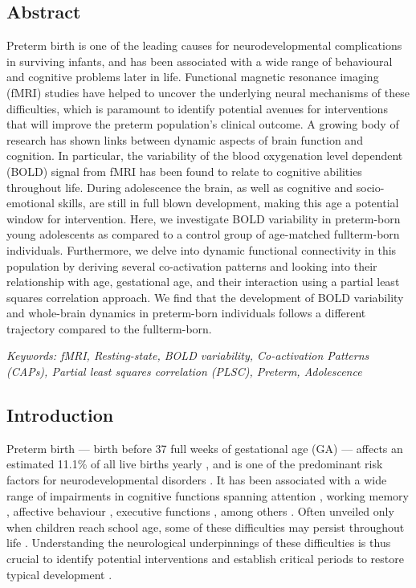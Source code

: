 \subsection*{Abstract}

Preterm birth is one of the leading causes for neurodevelopmental complications in surviving infants, and has been associated with a wide range of behavioural and cognitive problems later in life. Functional magnetic resonance imaging (fMRI) studies have helped to uncover the underlying neural mechanisms of these difficulties, which is paramount to identify potential avenues for interventions that will improve the preterm population's clinical outcome. A growing body of research has shown links between dynamic aspects of brain function and cognition. In particular, the variability of the blood oxygenation level dependent (BOLD) signal from fMRI has been found to relate to cognitive abilities throughout life. During adolescence the brain, as well as cognitive and socio-emotional skills, are still in full blown development, making this age a potential window for intervention. Here, we investigate BOLD variability in preterm-born young adolescents as compared to a control group of age-matched fullterm-born individuals. Furthermore, we delve into dynamic functional connectivity in this population by deriving several co-activation patterns and looking into their relationship with age, gestational age, and their interaction using a partial least squares correlation approach. We find that the development of BOLD variability and whole-brain dynamics in preterm-born individuals follows a different trajectory compared to the fullterm-born.


\textit{Keywords: fMRI, Resting-state, BOLD variability, Co-activation Patterns (CAPs), Partial least squares correlation (PLSC), Preterm, Adolescence}

\subsection{Introduction}
 Preterm birth --- birth before 37 full weeks of gestational age (GA) --- affects an estimated 11.1\% of all live births yearly \citep{Blencowe2013}, and is one of the predominant risk factors for neurodevelopmental disorders \citep{Twilhaar2018}. 
    It has been associated with a wide range of impairments in cognitive functions spanning attention \citep{Rommel2017}, working memory \citep{Allotey2018}, affective behaviour \citep{Hornman2016}, executive functions \citep{Costa2017, Burnett2018}, among others \citep{Moreira2014, Allotey2018}. Often unveiled only when children reach school age, some of these difficulties may persist throughout life \citep{Anderson2014, Kajantie2019}. Understanding the neurological underpinnings of these difficulties is thus crucial to identify potential interventions and establish critical periods to restore typical development \citep{Wolke2019}.
    
